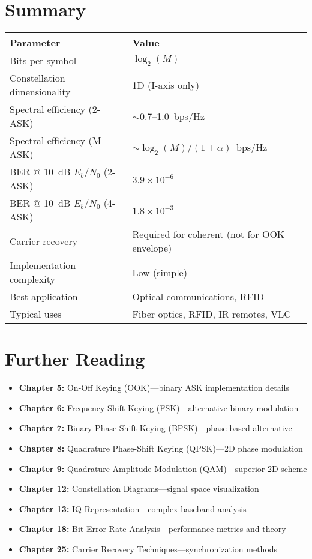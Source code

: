 \section{Summary}

\begin{center}
\begin{tabular}{@{}ll@{}}
\toprule
\textbf{Parameter} & \textbf{Value} \\
\midrule
Bits per symbol & $\log_2(M)$ \\
Constellation dimensionality & 1D (I-axis only) \\
Spectral efficiency (2-ASK) & $\sim$0.7--1.0~bps/Hz \\
Spectral efficiency (M-ASK) & $\sim\log_2(M)/(1+\alpha)$~bps/Hz \\
BER @ 10~dB $E_b/N_0$ (2-ASK) & $3.9 \times 10^{-6}$ \\
BER @ 10~dB $E_b/N_0$ (4-ASK) & $1.8 \times 10^{-3}$ \\
Carrier recovery & Required for coherent (not for OOK envelope) \\
Implementation complexity & Low (simple) \\
Best application & Optical communications, RFID \\
Typical uses & Fiber optics, RFID, IR remotes, VLC \\
\bottomrule
\end{tabular}
\end{center}

\section{Further Reading}

\begin{itemize}
\item \textbf{Chapter 5:} On-Off Keying (OOK)---binary ASK implementation details
\item \textbf{Chapter 6:} Frequency-Shift Keying (FSK)---alternative binary modulation
\item \textbf{Chapter 7:} Binary Phase-Shift Keying (BPSK)---phase-based alternative
\item \textbf{Chapter 8:} Quadrature Phase-Shift Keying (QPSK)---2D phase modulation
\item \textbf{Chapter 9:} Quadrature Amplitude Modulation (QAM)---superior 2D scheme
\item \textbf{Chapter 12:} Constellation Diagrams---signal space visualization
\item \textbf{Chapter 13:} IQ Representation---complex baseband analysis
\item \textbf{Chapter 18:} Bit Error Rate Analysis---performance metrics and theory
\item \textbf{Chapter 25:} Carrier Recovery Techniques---synchronization methods
\end{itemize}
